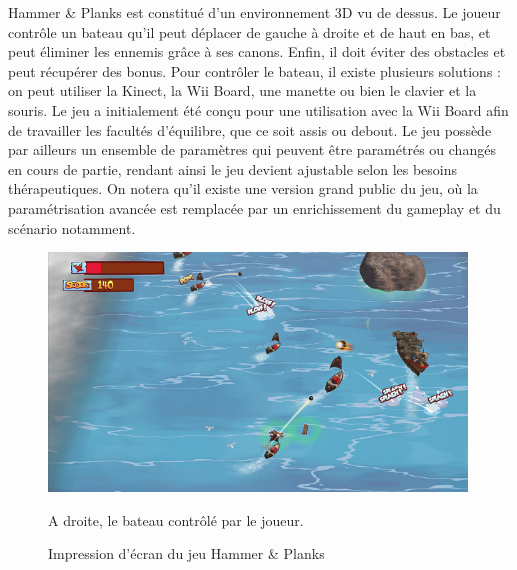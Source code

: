 Hammer \& Planks est constitué d’un environnement 3D vu de dessus. Le joueur contrôle un bateau qu'il peut déplacer de gauche à droite et de haut en bas, et peut éliminer les ennemis grâce à ses canons. Enfin, il doit éviter des obstacles et peut récupérer des bonus. Pour contrôler le bateau, il existe plusieurs solutions : on peut utiliser la Kinect, la Wii Board, une manette ou bien le clavier et la souris. Le jeu a initialement été conçu pour une utilisation avec la Wii Board afin de travailler les facultés d'équilibre, que ce soit assis ou debout. Le jeu possède par ailleurs un ensemble de paramètres qui peuvent être paramétrés ou changés en cours de partie, rendant ainsi le jeu devient ajustable selon les besoins thérapeutiques. On notera qu'il existe une version grand public du jeu, où la paramétrisation avancée est remplacée par un enrichissement du gameplay et du scénario notamment.
	\begin{figure}[!t]
		\centering
		\includegraphics[width=420px]{images/hammer_and_planks.png}
		\caption{Impression d'écran du jeu Hammer \& Planks}
		A droite, le bateau contrôlé par le joueur.
		\label{hammer_and_planks}
	\end{figure}
